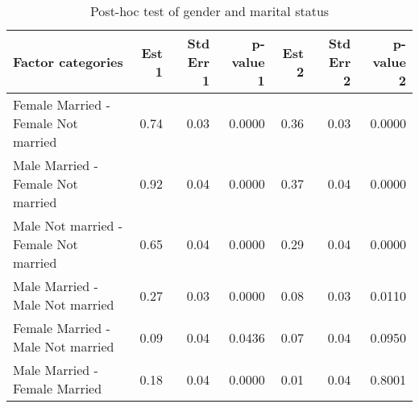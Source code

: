 \documentclass[11pt]{extarticle} %
\begin{document}
\begin{table}[H]
\footnotesize
\centering
\begin{tabular}{lrrrrrr}
  \hline
  Factor categories & Est 1 & Std Err 1 & p-value 1 & Est 2 & Std Err 2 & p-value 2 \\ 
  \hline
    Female Married -  Female Not married & 0.74 & 0.03 & 0.0000 & 0.36 & 0.03 & 0.0000 \\ 
    Male Married -  Female Not married & 0.92 & 0.04 & 0.0000 & 0.37 & 0.04 & 0.0000 \\ 
    Male Not married -  Female Not married & 0.65 & 0.04 & 0.0000 & 0.29 & 0.04 & 0.0000 \\ 
    Male Married -  Male Not married & 0.27 & 0.03 & 0.0000 & 0.08 & 0.03 & 0.0110 \\ 
    Female Married -  Male Not married & 0.09 & 0.04 & 0.0436 & 0.07 & 0.04 & 0.0950 \\ 
    Male Married -  Female Married & 0.18 & 0.04 & 0.0000 & 0.01 & 0.04 & 0.8001 \\ 
  \hline
\end{tabular}
\caption{Post-hoc test of gender and marital status} 
\label{tab:GenderMS}
\end{table}
\end{document}
